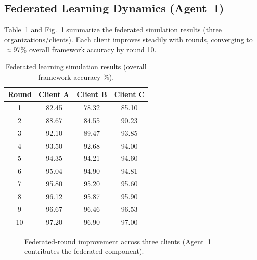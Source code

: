 \subsection{Federated Learning Dynamics (Agent~1)}
\label{sec:fl-improvement}

Table~\ref{tab:fl_sim} and Fig.~\ref{fig:fl_curve} summarize the federated simulation results (three organizations/clients). Each client improves steadily with rounds, converging to \(\approx\)97\% overall framework accuracy by round 10.

\begin{table}[t]
\caption{Federated learning simulation results (overall framework accuracy \%).}
\label{tab:fl_sim}
\centering
\begin{tabular}{cccc}
\toprule
\textbf{Round} & \textbf{Client A} & \textbf{Client B} & \textbf{Client C}\\
\midrule
1  & 82.45 & 78.32 & 85.10\\
2  & 88.67 & 84.55 & 90.23\\
3  & 92.10 & 89.47 & 93.85\\
4  & 93.50 & 92.68 & 94.00\\
5  & 94.35 & 94.21 & 94.60\\
6  & 95.04 & 94.90 & 94.81\\
7  & 95.80 & 95.20 & 95.60\\
8  & 96.12 & 95.87 & 95.90\\
9  & 96.67 & 96.46 & 96.53\\
10 & 97.20 & 96.90 & 97.00\\
\bottomrule
\end{tabular}
\end{table}

\begin{figure}[t]
\centering
{}
\caption{Federated-round improvement across three clients (Agent~1 contributes the federated component).}
\label{fig:fl_curve}
\end{figure}

